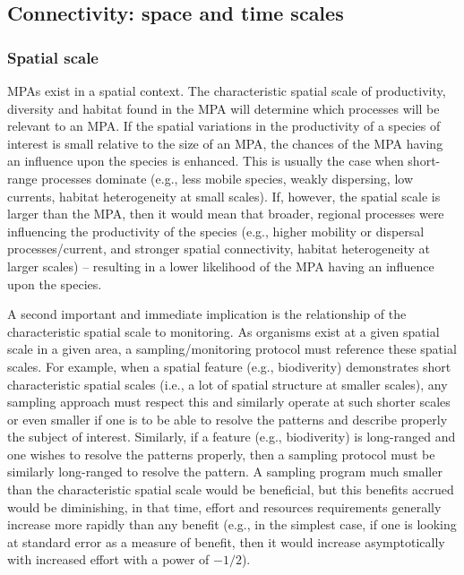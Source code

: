 \documentclass[letterpaper,portrait,11pt]{scrartcl}
\numberwithin{equation}{section}		%
\numberwithin{figure}{section}		%
\numberwithin{table}{section}				%
\begin{document}
\subsection{Connectivity: space and time scales}

\subsubsection{Spatial scale}
\label{sec:interpolationSpatial}

MPAs exist in a spatial context. The characteristic spatial scale of productivity, diversity and habitat found in the MPA will determine which processes will be relevant to an MPA. If the spatial variations in the productivity of a species of interest is small relative to the size of an MPA, the chances of the MPA having an influence upon the species is enhanced. This is usually the case when short-range processes dominate (e.g., less mobile species, weakly dispersing, low currents, habitat heterogeneity at small scales). If, however, the spatial scale is larger than the MPA, then it would mean that broader, regional processes were influencing the productivity of the species (e.g., higher mobility or dispersal processes/current, and stronger spatial connectivity, habitat heterogeneity at larger scales) -- resulting in a lower likelihood of the MPA having an influence upon the species. 

A second important and immediate implication is the relationship of the characteristic spatial scale to monitoring. As organisms exist at a given spatial scale in a given area, a sampling/monitoring protocol must reference these spatial scales. For example, when a spatial feature (e.g., biodiverity) demonstrates short characteristic spatial scales (i.e., a lot of spatial structure at smaller scales), any sampling approach must respect this and similarly operate at such shorter scales or even smaller if one is to be able to resolve the patterns and describe properly the subject of interest. Similarly, if a feature (e.g., biodiverity) is long-ranged and one wishes to resolve the patterns properly, then a sampling protocol must be similarly long-ranged to resolve the pattern. A sampling program much smaller than the characteristic spatial scale would be beneficial, but this benefits accrued would be diminishing, in that time, effort and resources requirements generally increase more rapidly than any benefit (e.g., in the simplest case, if one is looking at standard error as a measure of benefit, then it would increase asymptotically with increased effort with a power of $-1/2$). 
\end{document}
